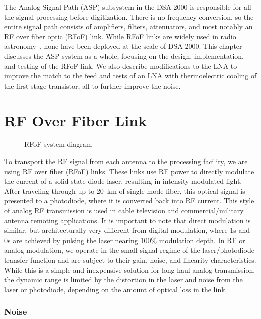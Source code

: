 The Analog Signal Path (ASP) subsystem in the DSA-2000 is responsible for all the signal processing before digitization.
There is no frequency conversion, so the entire signal path consists of amplifiers, filters, attenuators, and most notably an RF over fiber optic (RFoF) link.
While RFoF links are widely used in radio astronomy~\cite{periniRadioFrequencyFiber2022,menaRadioFrequencyoverFiberLinkLargearray2013,montebugnoliLargeAntennaArray2005}, none have been deployed at the scale of DSA-2000.
This chapter discusses the ASP system as a whole, focusing on the design, implementation, and testing of the RFoF link.
We also describe modifications to the LNA to improve the match to the feed and tests of an LNA with thermoelectric cooling of the first stage transistor, all to further improve the noise.

\section{RF Over Fiber Link}

\begin{figure}[ht!]
    \centering
    
    \caption{RFoF system diagram}
    \label{fig:rfof_diagram}
\end{figure}

To transport the RF signal from each antenna to the processing facility, we are using RF over fiber (RFoF) links.
These links use RF power to directly modulate the current of a solid-state diode laser, resulting in intensity modulated light.
After traveling through up to \qty{20}{\km} of single mode fiber, this optical signal is presented to a photodiode, where it is converted back into RF current.
This style of analog RF transmission is used in cable television and commercial/military antenna remoting applications.
It is important to note that direct modulation is similar, but architecturally very different from digital modulation, where 1s and 0s are achieved by pulsing the laser nearing 100\% modulation depth.
In RF or analog modulation, we operate in the small signal regime of the laser/photodiode transfer function and are subject to their gain, noise, and linearity characteristics.
While this is a simple and inexpensive solution for long-haul analog transmission, the dynamic range is limited by the distortion in the laser and noise from the laser or photodiode, depending on the amount of optical loss in the link.

\subsubsection{Noise}

